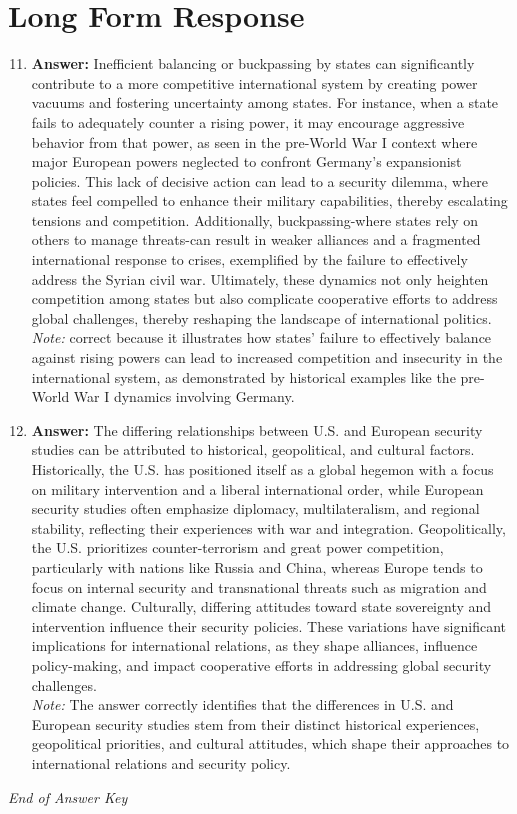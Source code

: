 \documentclass[12pt]{article}
\begin{document}
\section*{Long Form Response}
\begin{enumerate}[label=\arabic*.]
\setcounter{enumi}{10}
\item \textbf{Answer:} Inefficient balancing or buckpassing by states can significantly contribute to a more competitive international system by creating power vacuums and fostering uncertainty among states. For instance, when a state fails to adequately counter a rising power, it may encourage aggressive behavior from that power, as seen in the pre-World War I context where major European powers neglected to confront Germany's expansionist policies. This lack of decisive action can lead to a security dilemma, where states feel compelled to enhance their military capabilities, thereby escalating tensions and competition. Additionally, buckpassing-where states rely on others to manage threats-can result in weaker alliances and a fragmented international response to crises, exemplified by the failure to effectively address the Syrian civil war. Ultimately, these dynamics not only heighten competition among states but also complicate cooperative efforts to address global challenges, thereby reshaping the landscape of international politics.
\\ \textit{Note:} correct because it illustrates how states' failure to effectively balance against rising powers can lead to increased competition and insecurity in the international system, as demonstrated by historical examples like the pre-World War I dynamics involving Germany.
\item \textbf{Answer:} The differing relationships between U.S. and European security studies can be attributed to historical, geopolitical, and cultural factors. Historically, the U.S. has positioned itself as a global hegemon with a focus on military intervention and a liberal international order, while European security studies often emphasize diplomacy, multilateralism, and regional stability, reflecting their experiences with war and integration. Geopolitically, the U.S. prioritizes counter-terrorism and great power competition, particularly with nations like Russia and China, whereas Europe tends to focus on internal security and transnational threats such as migration and climate change. Culturally, differing attitudes toward state sovereignty and intervention influence their security policies. These variations have significant implications for international relations, as they shape alliances, influence policy-making, and impact cooperative efforts in addressing global security challenges.
\\ \textit{Note:} The answer correctly identifies that the differences in U.S. and European security studies stem from their distinct historical experiences, geopolitical priorities, and cultural attitudes, which shape their approaches to international relations and security policy.
\end{enumerate}

\vfill
\noindent\textit{End of Answer Key}
\end{document}
